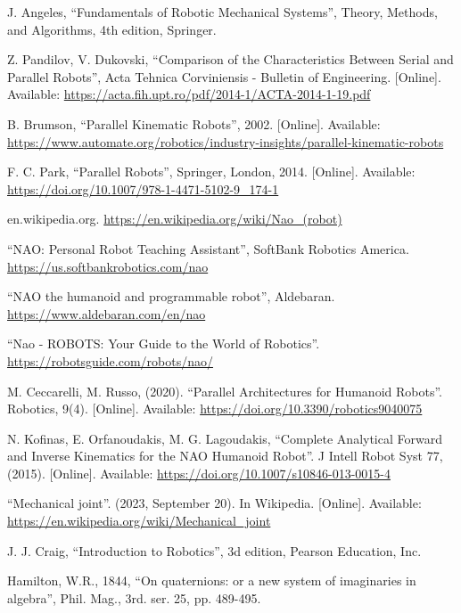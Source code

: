 \documentclass[conference]{IEEEtran}
\begin{document}
\begin{thebibliography}{00}

 J. Angeles, ``Fundamentals of Robotic Mechanical Systems'', Theory, Methods, and Algorithms, 4th edition, Springer.

 Z. Pandilov, V. Dukovski, ``Comparison of the Characteristics Between Serial and Parallel Robots'', Acta Tehnica Corviniensis - Bulletin of Engineering. [Online]. Available: \href{https://acta.fih.upt.ro/pdf/2014-1/ACTA-2014-1-19.pdf}{https://acta.fih.upt.ro/pdf/2014-1/ACTA-2014-1-19.pdf}

 B. Brumson, ``Parallel Kinematic Robots'', 2002. [Online]. Available: \href{https://www.automate.org/robotics/industry-insights/parallel-kinematic-robots}{https://www.automate.org/robotics/industry-insights/parallel-kinematic-robots}

 F. C. Park, ``Parallel Robots'', Springer, London, 2014. [Online]. Available: \url{https://doi.org/10.1007/978-1-4471-5102-9_174-1}

 en.wikipedia.org. \url{https://en.wikipedia.org/wiki/Nao_(robot)}

 ``NAO: Personal Robot Teaching Assistant'', SoftBank Robotics America.\, \url{https://us.softbankrobotics.com/nao}

 ``NAO the humanoid and programmable robot'', Aldebaran.\, \url{https://www.aldebaran.com/en/nao}

 ``Nao - ROBOTS: Your Guide to the World of Robotics''.\, \url{https://robotsguide.com/robots/nao/}

 M. Ceccarelli, M. Russo, (2020). ``Parallel Architectures for Humanoid Robots''. Robotics, 9(4). [Online]. Available: \url{https://doi.org/10.3390/robotics9040075}

 N. Kofinas, E. Orfanoudakis, M. G. Lagoudakis, ``Complete Analytical Forward and Inverse Kinematics for the NAO Humanoid Robot''. J Intell Robot Syst 77, (2015). [Online]. Available: \url{https://doi.org/10.1007/s10846-013-0015-4}

 ``Mechanical joint''. (2023, September 20). In Wikipedia. [Online]. Available: \url{https://en.wikipedia.org/wiki/Mechanical_joint}

 J. J. Craig, ``Introduction to Robotics'', 3d edition, Pearson Education, Inc.

 Hamilton, W.R., 1844, ``On quaternions: or a new system of imaginaries in algebra'', Phil. Mag., 3rd. ser. 25, pp. 489-495.
\end{thebibliography}
\end{document}
